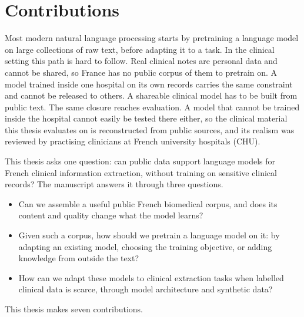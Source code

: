 \chapter{Contributions}
\label{chap:contributions}

\begin{reviewrewrite}
Most modern natural language processing starts by pretraining a language model on large collections of raw text, before adapting it to a task. In the clinical setting this path is hard to follow. Real clinical notes are personal data and cannot be shared, so France has no public corpus of them to pretrain on. A model trained inside one hospital on its own records carries the same constraint and cannot be released to others. A shareable clinical model has to be built from public text. The same closure reaches evaluation. A model that cannot be trained inside the hospital cannot easily be tested there either, so the clinical material this thesis evaluates on is reconstructed from public sources, and its realism was reviewed by practising clinicians at French university hospitals (CHU).
\end{reviewrewrite}

\begin{reviewrewrite}
This thesis asks one question: can public data support language models for French clinical information extraction, without training on sensitive clinical records? The manuscript answers it through three questions.
\end{reviewrewrite}

\begin{itemize}
  \item Can we assemble a useful public French biomedical corpus, and does its content and quality change what the model learns?
  \item Given such a corpus, how should we pretrain a language model on it: by adapting an existing model, choosing the training objective, or adding knowledge from outside the text?
  \item How can we adapt these models to clinical extraction tasks when labelled clinical data is scarce, through model architecture and synthetic data?
\end{itemize}

\begin{reviewrewrite}
This thesis makes seven contributions.
\end{reviewrewrite}

